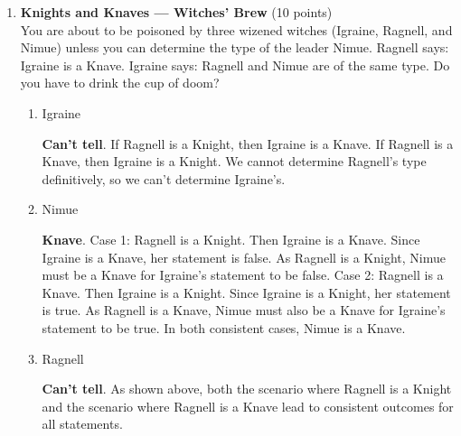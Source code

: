 \begin{enumerate}
  \item \textbf{Knights and Knaves --- Witches' Brew} (10 points)\\
  You are about to be poisoned by three wizened witches (Igraine, Ragnell, and Nimue) unless you can determine the type of the leader Nimue. Ragnell says: Igraine is a Knave. Igraine says: Ragnell and Nimue are of the same type. Do you have to drink the cup of doom?
  \begin{enumerate}[label=\arabic*.]
    \item Igraine\\
    \begin{subanswer}
      \textbf{Can't tell}. If Ragnell is a Knight, then Igraine is a Knave. If Ragnell is a Knave, then Igraine is a Knight. We cannot determine Ragnell's type definitively, so we can't determine Igraine's.
    \end{subanswer}
    \item Nimue\\
    \begin{subanswer}
      \textbf{Knave}.
      Case 1: Ragnell is a Knight. Then Igraine is a Knave. Since Igraine is a Knave, her statement  is false. As Ragnell is a Knight, Nimue must be a Knave for Igraine's statement to be false.
      Case 2: Ragnell is a Knave. Then Igraine is a Knight. Since Igraine is a Knight, her statement  is true. As Ragnell is a Knave, Nimue must also be a Knave for Igraine's statement to be true.
      In both consistent cases, Nimue is a Knave.
    \end{subanswer}
    \item Ragnell\\
    \begin{subanswer}
      \textbf{Can't tell}. As shown above, both the scenario where Ragnell is a Knight and the scenario where Ragnell is a Knave lead to consistent outcomes for all statements.
    \end{subanswer}
  \end{enumerate}


\end{enumerate}
